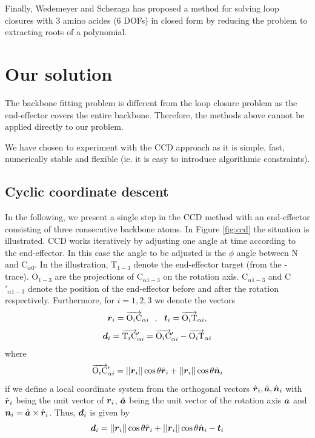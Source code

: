 Finally, Wedemeyer and Scheraga has proposed a method for solving loop closures with 3 amino acides (6 DOFs) in closed form by reducing the problem to extracting roots of a polynomial\cite{wedemeyer1999exact}.


\section{Our solution}
The backbone fitting problem is different from the loop closure problem as the end-effector covers the entire backbone.
Therefore, the methods above cannot be applied directly to our problem.

We have chosen to experiment with the CCD approach as it is simple, fast, numerically stable and flexible (ie. it is easy to introduce algorithmic constraints).

\subsection{Cyclic coordinate descent}
In the following, we present a single step in the CCD method with an end-effector consisting of three consecutive \Ca backbone atoms.
In Figure \ref{fig:ccd} the situation is illustrated.
CCD works iteratively by adjusting one angle at time according to the end-effector.
In this case the angle to be adjusted is the $\phi$ angle between N and C$_{\alpha0}$.
In the illustration, T$_{1-3}$ denote the end-effector target (from the \Ca-trace). O$_{1-3}$ are the projections of C$_{\alpha1-3}$ on the rotation axis. C$_{\alpha1-3}$ and C$'_{\alpha1-3}$ denote the position of the end-effector before and after the rotation respectively.
Furthermore, for $i=1,2,3$ we denote the vectors
 $$\boldsymbol{r}_i = \overrightarrow{\text{O}_i\text{C}}_{\alpha i}~~,~~ \boldsymbol{t}_i = \overrightarrow{\text{O}_i\text{T}}_{\alpha i} , $$
$$\boldsymbol{d}_i = \overrightarrow{\text{T}_i\text{C}}'_{\alpha i} = \overrightarrow{\text{O}_i\text{C}}'_{\alpha i}-\overrightarrow{\text{O}_i\text{T}}_{\alpha i}$$
where
$$\overrightarrow{\text{O}_i\text{C}}'_{\alpha i} = ||\boldsymbol{r}_i||\cos\theta\hat{\boldsymbol{r}}_i + ||\boldsymbol{r}_i||\cos\theta\hat{\boldsymbol{n}}_i$$
if we define a local coordinate system from the orthogonal vectors $\hat{\boldsymbol{r}}_i, \hat{\boldsymbol{a}}, \hat{\boldsymbol{n}}_i$ with $\hat{\boldsymbol{r}}_i$ being the unit vector of $\boldsymbol{r}_i$, $\hat{\boldsymbol{a}}$ being the unit vector of the rotation axis $\boldsymbol{a}$ and $\boldsymbol{n}_i = \hat{\boldsymbol{a}} \times \hat{\boldsymbol{r}}_i$.
Thus, $\boldsymbol{d}_i$ is given by
$$\boldsymbol{d}_i =  ||\boldsymbol{r}_i||\cos\theta\hat{\boldsymbol{r}}_i + ||\boldsymbol{r}_i||\cos\theta\hat{\boldsymbol{n}}_i - \boldsymbol{t}_i$$


